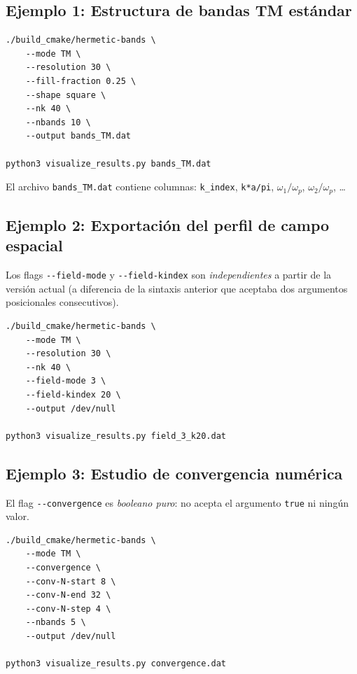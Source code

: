 \documentclass[12pt,a4paper]{article}
\newcommand{\omegap}{\omega_p}
\begin{document}
\subsection{Ejemplo 1: Estructura de bandas TM estándar}

\begin{lstlisting}[style=bash, caption={Estructura de bandas TM con resolución $30\times30$, 10 bandas.}]
./build_cmake/hermetic-bands \
    --mode TM \
    --resolution 30 \
    --fill-fraction 0.25 \
    --shape square \
    --nk 40 \
    --nbands 10 \
    --output bands_TM.dat

python3 visualize_results.py bands_TM.dat
\end{lstlisting}

El archivo \texttt{bands\_TM.dat} contiene columnas:
\texttt{k\_index}, \texttt{k*a/pi}, $\omega_1/\omegap$, $\omega_2/\omegap$, \ldots

\subsection{Ejemplo 2: Exportación del perfil de campo espacial}

Los flags \texttt{-{}-field-mode} y \texttt{-{}-field-kindex} son
\emph{independientes} a partir de la versión actual (a diferencia de
la sintaxis anterior que aceptaba dos argumentos posicionales consecutivos).

\begin{lstlisting}[style=bash, caption={Exportar el perfil de campo de la banda 3 en el punto $k$ de índice 20.}]
./build_cmake/hermetic-bands \
    --mode TM \
    --resolution 30 \
    --nk 40 \
    --field-mode 3 \
    --field-kindex 20 \
    --output /dev/null

python3 visualize_results.py field_3_k20.dat
\end{lstlisting}

\subsection{Ejemplo 3: Estudio de convergencia numérica}

El flag \texttt{-{}-convergence} es \emph{booleano puro}: no acepta
el argumento \texttt{true} ni ningún valor.

\begin{lstlisting}[style=bash, caption={Estudio de convergencia en el punto $X$ ($k_x=\pi$) de $N=8$ a $N=32$.}]
./build_cmake/hermetic-bands \
    --mode TM \
    --convergence \
    --conv-N-start 8 \
    --conv-N-end 32 \
    --conv-N-step 4 \
    --nbands 5 \
    --output /dev/null

python3 visualize_results.py convergence.dat
\end{lstlisting}
\end{document}
